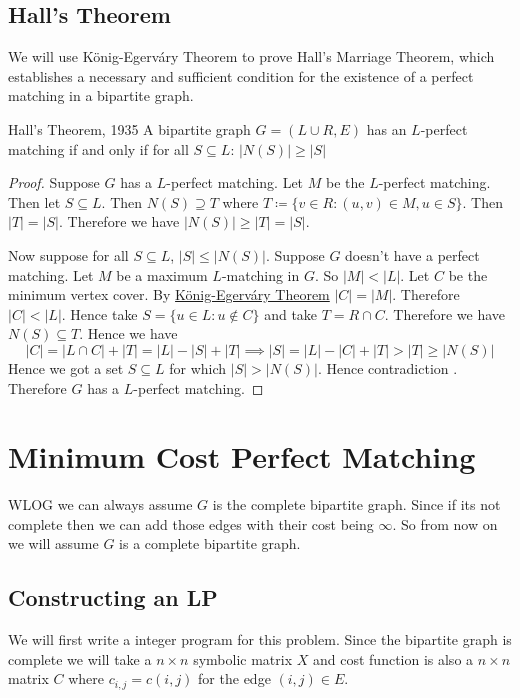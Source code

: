 \subsection{Hall's Theorem}
We will use K\"{o}nig-Egerv\'{a}ry Theorem to prove Hall's Marriage Theorem, which establishes a necessary and sufficient condition for the existence of a perfect matching in a bipartite graph.
\begin{Theorem}{Hall's Theorem, 1935}{}
	A bipartite graph $G=(L\cup R,E)$ has an $L$-perfect matching if and only if for all $S\subseteq L$: $|N(S)|\geq |S|$
\end{Theorem}
\begin{proof}
	Suppose $G$ has a $L$-perfect matching. Let $M$ be the $L$-perfect matching. Then let $S\subseteq L$. Then $N(S)\supseteq T$ where $T\coloneqq\{v\in R\colon (u,v)\in M, u\in S\}$. Then $|T|=|S|$. Therefore we have $|N(S)|\geq |T|=|S|$. 
	
	Now suppose for all $S\subseteq L$, $|S|\leq |N(S)|$. Suppose $G$ doesn't have a perfect matching. Let $M$ be a maximum $L$-matching in $G$. So $|M|<|L|$. Let $C$ be the minimum vertex cover. By \hyperref[th:konig-egervary]{K\"{o}nig-Egerv\'{a}ry Theorem} $|C|=|M|$. Therefore $|C|<|L|$. Hence take $S=\{u\in L\colon u\notin C\}$ and take $T=R\cap C$. Therefore we have $N(S)\subseteq T$. Hence we have $$|C|=|L\cap C|+|T|=|L|-|S|+|T|\implies |S|=|L|-|C|+|T|> |T|\geq |N(S)|$$Hence we got a set $S\subseteq L$ for which $|S|> |N(S)|$. Hence contradiction \ctr. Therefore $G$ has a $L$-perfect matching.
\end{proof}
\section{Minimum Cost Perfect Matching}
\begin{algoprob}
\end{algoprob}

WLOG we can always assume $G$ is the complete bipartite graph. Since if its not complete then we can add those edges with their cost being $\infty$. So from now on we will assume $G$ is a complete bipartite graph. 
\subsection{Constructing an LP}
We will first write a integer program for this problem. Since the bipartite graph is complete we will take a $n\times n$ symbolic matrix $X$ and cost function is also a $n\times n$ matrix $C$ where $c_{i,j}=c(i,j)$ for the edge $(i,j)\in E$.\parinf\vspace*{5mm}

